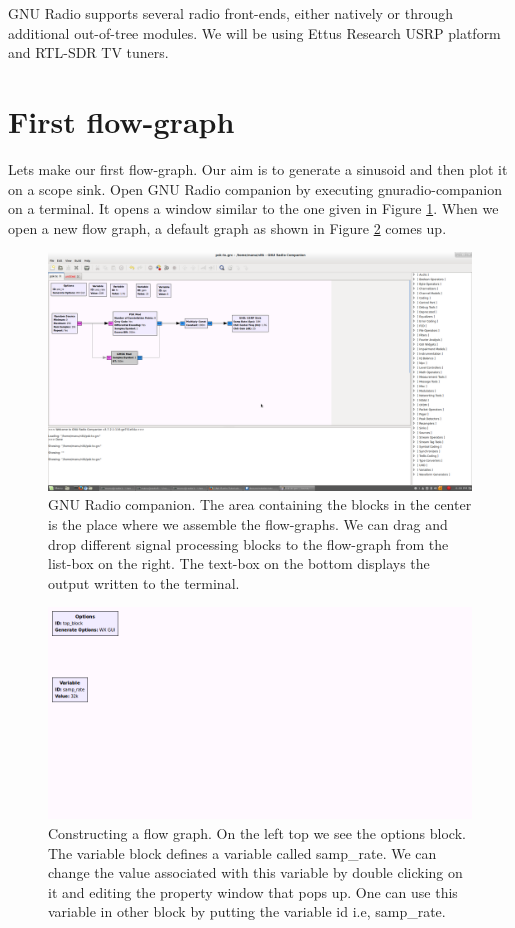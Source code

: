 \documentclass[a4paper,10pt]{report}
\begin{document}
GNU Radio supports several radio front-ends, either natively or through additional out-of-tree modules.
We will be using Ettus Research USRP platform and RTL-SDR TV tuners.

\section{First flow-graph}
Lets make our first flow-graph. Our aim is to generate a sinusoid and then plot it on a scope sink.
Open GNU Radio companion by executing gnuradio-companion on a terminal. 
It opens a window similar to the one given in Figure \ref{fig:grc}.
When we open a new flow graph, a default graph as shown in Figure \ref{fig:audio-play1} comes up.

\begin{figure}
\centering
 \includegraphics[scale=0.23]{figures/grc.png}
 \caption{GNU Radio companion. The area containing the blocks in the center is the place where we assemble the flow-graphs.
 We can drag and drop different signal processing blocks to the flow-graph from the list-box on the right.
 The text-box on the bottom displays the output written to the terminal.\label{fig:grc}}
\end{figure}
\begin{figure}
\centering
 \includegraphics[scale=0.4]{figures/gnuradio-new-flowgraph.png}
 \caption{Constructing a flow graph. On the left top we see the options block. The variable block defines a variable called samp\_rate.
 We can change the value associated with this variable by double clicking on it and editing the property window that pops up.
 One can use this variable in other block by putting the variable id i.e, samp\_rate.
 \label{fig:audio-play1}}
\end{figure}
\end{document}
